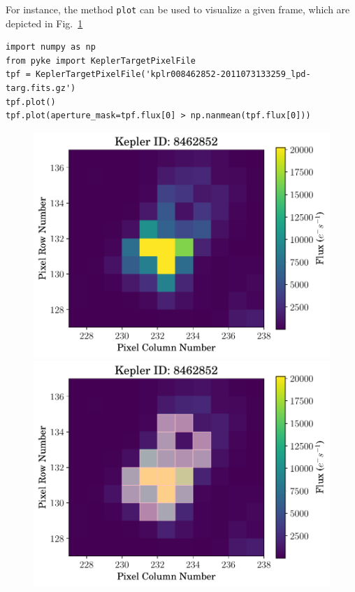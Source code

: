 \documentclass{article}
\begin{document}
        For instance, the method \texttt{plot} can be used to visualize a
        given frame, which are depicted in Fig.~\ref{fig:plot-method}
\begin{verbatim}
import numpy as np
from pyke import KeplerTargetPixelFile
tpf = KeplerTargetPixelFile('kplr008462852-2011073133259_lpd-targ.fits.gz')
tpf.plot()
tpf.plot(aperture_mask=tpf.flux[0] > np.nanmean(tpf.flux[0]))
\end{verbatim}

        \begin{figure}[!htb]
            \includegraphics[scale=.4]{figs/tpf-plot.pdf}
            \includegraphics[scale=.4]{figs/tpf-plot-aperture.pdf}
            \caption{}
            \label{fig:plot-method}
        \end{figure}
\end{document}
